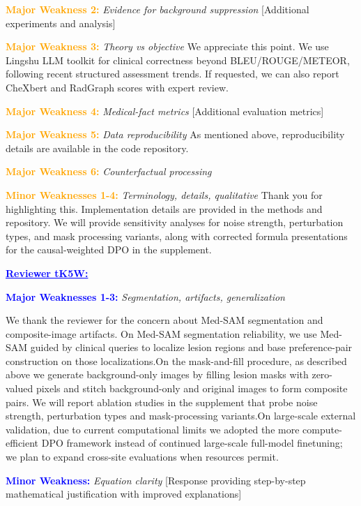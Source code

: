\documentclass[10pt,twocolumn,letterpaper]{article}
\begin{document}
\textcolor{orange}{\textbf{Major Weakness 2:}} \textit{Evidence for background suppression}
[Additional experiments and analysis]

\textcolor{orange}{\textbf{Major Weakness 3:}} \textit{Theory vs objective}
We appreciate this point. We use Lingshu LLM toolkit for clinical correctness beyond BLEU/ROUGE/METEOR, following recent structured assessment trends. If requested, we can also report CheXbert and RadGraph scores with expert review.

\textcolor{orange}{\textbf{Major Weakness 4:}} \textit{Medical-fact metrics}
[Additional evaluation metrics]

\textcolor{orange}{\textbf{Major Weakness 5:}} \textit{Data reproducibility}
As mentioned above, reproducibility details are available in the code repository.

\textcolor{orange}{\textbf{Major Weakness 6:}} \textit{Counterfactual processing}


\textcolor{orange}{\textbf{Minor Weaknesses 1-4:}} \textit{Terminology, details, qualitative}
Thank you for highlighting this. Implementation details are provided in the methods and repository. We will provide sensitivity analyses for noise strength, perturbation types, and mask processing variants, along with corrected formula presentations for the causal-weighted DPO in the supplement.

\noindent \textbf{\textcolor{blue}{\underline{Reviewer tK5W: }}}

\textcolor{blue}{\textbf{Major Weaknesses 1-3:}} \textit{Segmentation, artifacts, generalization}

We thank the reviewer for the concern about Med-SAM segmentation and composite-image artifacts. On Med-SAM segmentation reliability, we use Med-SAM guided by clinical queries to localize lesion regions and base preference-pair construction on those localizations.On the mask-and-fill procedure, as described above we generate background-only images by filling lesion masks with zero-valued pixels and stitch background-only and original images to form composite pairs. We will report ablation studies in the supplement that probe noise strength, perturbation types and mask-processing variants.On large-scale external validation, due to current computational limits we adopted the more compute-efficient DPO framework instead of continued large-scale full-model finetuning; we plan to expand cross-site evaluations when resources permit.

\textcolor{blue}{\textbf{Minor Weakness:}} \textit{Equation clarity}
[Response providing step-by-step mathematical justification with improved explanations]

{
    \small
    
    
}
\end{document}
